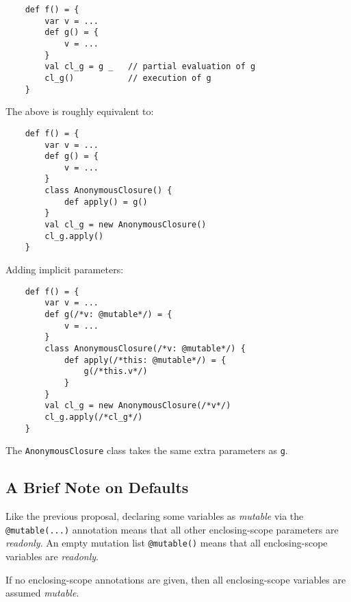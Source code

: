 \documentclass[letterpaper,11pt]{article}
\newcommand{\code}[1]{\lstinline$#1$}
\begin{document}
\begin{lstlisting}
	def f() = {
		var v = ...
		def g() = {
			v = ...
		}
		val cl_g = g _   // partial evaluation of g
		cl_g()           // execution of g
	}
\end{lstlisting}

The above is roughly equivalent to:

\begin{lstlisting}
	def f() = {
		var v = ...
		def g() = {
			v = ...
		}
		class AnonymousClosure() {
			def apply() = g()
		}
		val cl_g = new AnonymousClosure()
		cl_g.apply()
	}
\end{lstlisting}

Adding implicit parameters:

\begin{lstlisting}
	def f() = {
		var v = ...
		def g(/*v: @mutable*/) = {
			v = ...
		}
		class AnonymousClosure(/*v: @mutable*/) {
			def apply(/*this: @mutable*/) = {
				g(/*this.v*/)
			}
		}
		val cl_g = new AnonymousClosure(/*v*/)
		cl_g.apply(/*cl_g*/)
	}
\end{lstlisting}

The \code{AnonymousClosure} class takes the same extra parameters as \code{g}.

\subsection{A Brief Note on Defaults}

Like the previous proposal, declaring some variables as \emph{mutable} via the \code{@mutable(...)} annotation
means that all other enclosing-scope parameters are \emph{readonly}.
An empty mutation list \code{@mutable()} means that all enclosing-scope variables are \emph{readonly}.

If no enclosing-scope annotations are given, then all enclosing-scope variables are assumed \emph{mutable}.
\end{document}
